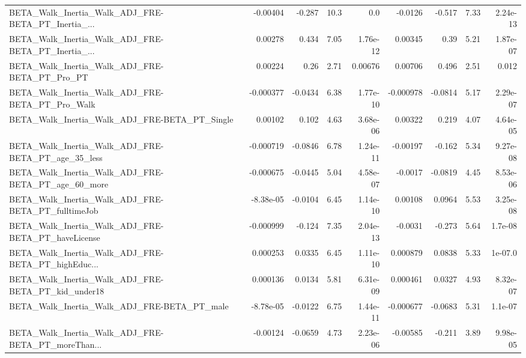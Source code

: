 \begin{tabular}{lrrrrrrrr}
BETA\_Walk\_Inertia\_Walk\_ADJ\_FRE-BETA\_PT\_Inertia\_... &    -0.00404 &       -0.287 &     10.3 &      0.0 &    -0.0126 &      -0.517 &         7.33 &      2.24e-13 \\
BETA\_Walk\_Inertia\_Walk\_ADJ\_FRE-BETA\_PT\_Inertia\_... &     0.00278 &        0.434 &     7.05 & 1.76e-12 &    0.00345 &        0.39 &         5.21 &      1.87e-07 \\
BETA\_Walk\_Inertia\_Walk\_ADJ\_FRE-BETA\_PT\_Pro\_PT      &     0.00224 &         0.26 &     2.71 &  0.00676 &    0.00706 &       0.496 &         2.51 &         0.012 \\
BETA\_Walk\_Inertia\_Walk\_ADJ\_FRE-BETA\_PT\_Pro\_Walk    &   -0.000377 &      -0.0434 &     6.38 & 1.77e-10 &  -0.000978 &     -0.0814 &         5.17 &      2.29e-07 \\
BETA\_Walk\_Inertia\_Walk\_ADJ\_FRE-BETA\_PT\_Single      &     0.00102 &        0.102 &     4.63 & 3.68e-06 &    0.00322 &       0.219 &         4.07 &      4.64e-05 \\
BETA\_Walk\_Inertia\_Walk\_ADJ\_FRE-BETA\_PT\_age\_35\_less &   -0.000719 &      -0.0846 &     6.78 & 1.24e-11 &   -0.00197 &      -0.162 &         5.34 &      9.27e-08 \\
BETA\_Walk\_Inertia\_Walk\_ADJ\_FRE-BETA\_PT\_age\_60\_more &   -0.000675 &      -0.0445 &     5.04 & 4.58e-07 &    -0.0017 &     -0.0819 &         4.45 &      8.53e-06 \\
BETA\_Walk\_Inertia\_Walk\_ADJ\_FRE-BETA\_PT\_fulltimeJob &   -8.38e-05 &      -0.0104 &     6.45 & 1.14e-10 &    0.00108 &      0.0964 &         5.53 &      3.25e-08 \\
BETA\_Walk\_Inertia\_Walk\_ADJ\_FRE-BETA\_PT\_haveLicense &   -0.000999 &       -0.124 &     7.35 & 2.04e-13 &    -0.0031 &      -0.273 &         5.64 &       1.7e-08 \\
BETA\_Walk\_Inertia\_Walk\_ADJ\_FRE-BETA\_PT\_highEduc... &    0.000253 &       0.0335 &     6.45 & 1.11e-10 &   0.000879 &      0.0838 &         5.33 &       1e-07.0 \\
BETA\_Walk\_Inertia\_Walk\_ADJ\_FRE-BETA\_PT\_kid\_under18 &    0.000136 &       0.0134 &     5.81 & 6.31e-09 &   0.000461 &      0.0327 &         4.93 &      8.32e-07 \\
BETA\_Walk\_Inertia\_Walk\_ADJ\_FRE-BETA\_PT\_male        &   -8.78e-05 &      -0.0122 &     6.75 & 1.44e-11 &  -0.000677 &     -0.0683 &         5.31 &       1.1e-07 \\
BETA\_Walk\_Inertia\_Walk\_ADJ\_FRE-BETA\_PT\_moreThan... &    -0.00124 &      -0.0659 &     4.73 & 2.23e-06 &   -0.00585 &      -0.211 &         3.89 &      9.98e-05 \\

\end{tabular}
